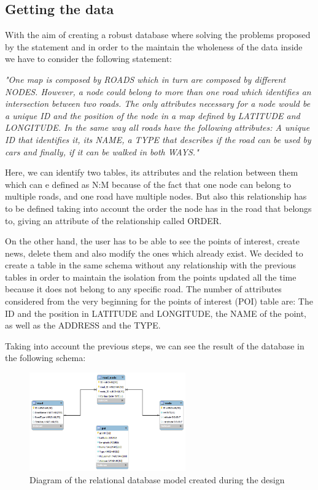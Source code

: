 \documentclass{article}
\begin{document}
\subsection{Getting the data}
With the aim of creating a robust database where solving the problems proposed by the statement and in order to the maintain the wholeness of the data inside we have to consider the following statement:

\textit{"One map is composed by ROADS which in turn are composed by different NODES. However, a node could belong to more than one road which identifies an intersection between two roads. The only attributes necessary for a node would be a unique ID and the position of the node in a map defined by LATITUDE and LONGITUDE. In the same way all roads have the following attributes: A unique ID that identifies it, its NAME, a TYPE that describes if the road can be used by cars and finally, if it can be walked in both WAYS."}

Here, we can identify two tables, its attributes and the relation between them which can e defined as N:M because of the fact that one node can belong to multiple roads, and one road have multiple nodes. But also this relationship has to be defined taking into account the order the node has in the road that belongs to, giving an attribute of the relationship called ORDER.

On the other hand, the user has to be able to see the points of interest, create news, delete them and also modify the ones which already exist. We decided to create a table in the same schema without any relationship with the previous tables in order to maintain the isolation from the points updated all the time because it does not belong to any specific road.
The number of attributes considered from the very beginning for the points of interest (POI) table are: The ID and the position in LATITUDE and LONGITUDE, the NAME of the point, as well as the ADDRESS and the TYPE.

Taking into account the previous steps, we can see the result of the database in the following schema:

\begin{figure}[h]
\centering
\includegraphics[width=0.6\textwidth]{EER_Diagram.png}
\caption{Diagram of the relational database model created during the design}
\label{fig:RelDBdiagram}
\end{figure}
\end{document}
